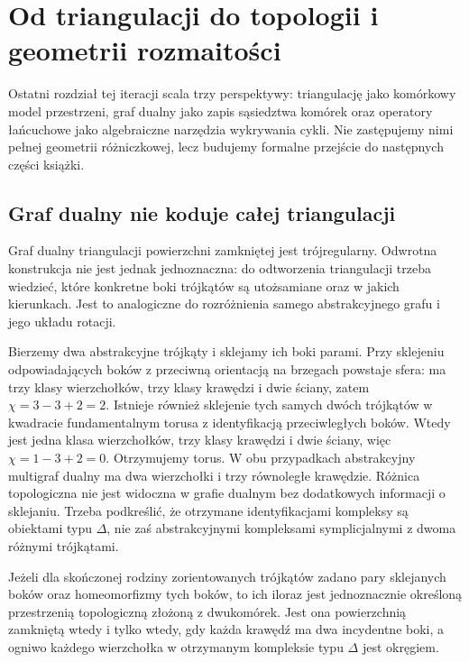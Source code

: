 \chapter{Od triangulacji do topologii i geometrii rozmaitości}
\label{ch:tg-most-geometria}

Ostatni rozdział tej iteracji scala trzy perspektywy:
triangulację jako komórkowy model przestrzeni,
graf dualny jako zapis sąsiedztwa komórek oraz
operatory łańcuchowe jako algebraiczne narzędzia
wykrywania cykli. Nie zastępujemy nimi pełnej
geometrii różniczkowej, lecz budujemy formalne
przejście do następnych części książki.

\section{Graf dualny nie koduje całej triangulacji}
\label{sec:tg-limit-dual}

Graf dualny triangulacji powierzchni zamkniętej jest
trójregularny. Odwrotna konstrukcja nie jest jednak
jednoznaczna: do odtworzenia triangulacji trzeba wiedzieć,
które konkretne boki trójkątów są utożsamiane oraz
w jakich kierunkach. Jest to analogiczne do rozróżnienia
samego abstrakcyjnego grafu i jego układu rotacji.

\begin{przyklad}
Bierzemy dwa abstrakcyjne trójkąty i sklejamy ich
boki parami. Przy sklejeniu odpowiadających boków
z przeciwną orientacją na brzegach powstaje sfera:
ma trzy klasy wierzchołków, trzy klasy krawędzi
i dwie ściany, zatem $\chi=3-3+2=2$.
Istnieje również sklejenie tych samych dwóch trójkątów
w kwadracie fundamentalnym torusa z identyfikacją
przeciwległych boków. Wtedy jest jedna klasa wierzchołków,
trzy klasy krawędzi i dwie ściany, więc
$\chi=1-3+2=0$. Otrzymujemy torus.
W obu przypadkach abstrakcyjny multigraf dualny
ma dwa wierzchołki i trzy równoległe krawędzie.
Różnica topologiczna nie jest widoczna w grafie
dualnym bez dodatkowych informacji o sklejaniu.
Trzeba podkreślić, że otrzymane identyfikacjami
kompleksy są obiektami typu $\Delta$, nie zaś
abstrakcyjnymi kompleksami symplicjalnymi z dwoma
różnymi trójkątami.
\end{przyklad}

\begin{stwierdzenie}
Jeżeli dla skończonej rodziny zorientowanych trójkątów
zadano pary sklejanych boków oraz homeomorfizmy
tych boków, to ich iloraz jest jednoznacznie określoną
przestrzenią topologiczną złożoną z dwukomórek.
Jest ona powierzchnią zamkniętą wtedy i tylko wtedy,
gdy każda krawędź ma dwa incydentne boki, a ogniwo
każdego wierzchołka w otrzymanym kompleksie typu
$\Delta$ jest okręgiem.
\end{stwierdzenie}


